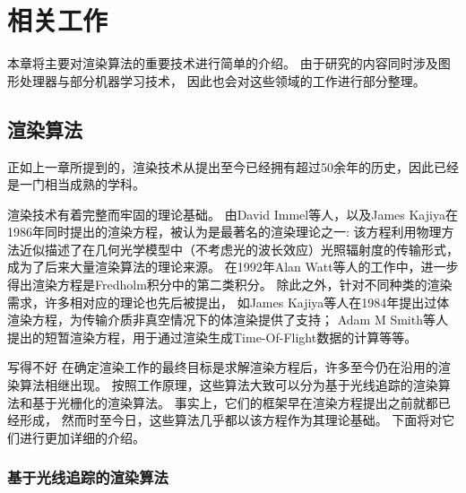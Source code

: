 \chapter{相关工作}
\label{cha:relatedwork}
本章将主要对渲染算法的重要技术进行简单的介绍。
由于研究的内容同时涉及图形处理器与部分机器学习技术，
因此也会对这些领域的工作进行部分整理。

\section{渲染算法}

正如上一章所提到的，渲染技术从提出至今已经拥有超过50余年的历史，因此已经是一门相当成熟的学科。


渲染技术有着完整而牢固的理论基础。
由David Immel等人\cite{RenderingEquation1}，以及James Kajiya\cite{RenderingEquation2}在1986年同时提出的渲染方程，被认为是最著名的渲染理论之一:
该方程利用物理方法近似描述了在几何光学模型中（不考虑光的波长效应）光照辐射度的传输形式，成为了后来大量渲染算法的理论来源。
在1992年Alan Watt等人的工作\cite{Fredholm}中，进一步得出渲染方程是Fredholm积分中的第二类积分。
除此之外，针对不同种类的渲染需求，许多相对应的理论也先后被提出，
如James Kajiya等人在1984年提出过体渲染方程\cite{VolumnRenderingEquation}，为传输介质非真空情况下的体渲染提供了支持；
Adam M Smith等人提出的短暂渲染方程\cite{TransientEquation}，用于通过渲染生成Time-Of-Flight数据的计算等等。


写得不好{
    在确定渲染工作的最终目标是求解渲染方程后，许多至今仍在沿用的渲染算法相继出现。
    按照工作原理，这些算法大致可以分为基于光线追踪的渲染算法和基于光栅化的渲染算法。   
    事实上，它们的框架早在渲染方程提出之前就都已经形成，
    然而时至今日，这些算法几乎都以该方程作为其理论基础。
}
下面将对它们进行更加详细的介绍。

\subsection{基于光线追踪的渲染算法}

